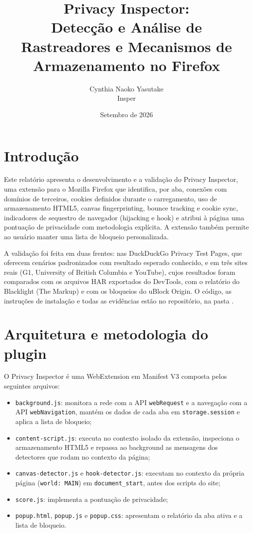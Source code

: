 \documentclass[11pt,a4paper]{article}
\title{
    Privacy Inspector:\\
    Detecção e Análise de Rastreadores e Mecanismos de Armazenamento no Firefox
}
\author{Cynthia Naoko Yasutake\\Insper}
\date{Setembro de 2026}
\begin{document}
\sloppy

\maketitle

\section{Introdução}

Este relatório apresenta o desenvolvimento e a validação do Privacy Inspector, uma extensão para o Mozilla Firefox que identifica, por aba, conexões com domínios de terceiros, cookies definidos durante o carregamento, uso de armazenamento HTML5, canvas fingerprinting, bounce tracking e cookie sync, indicadores de sequestro de navegador (hijacking e hook) e atribui à página uma pontuação de privacidade com metodologia explícita. A extensão também permite ao usuário manter uma lista de bloqueio personalizada.

A validação foi feita em duas frentes: nas DuckDuckGo Privacy Test Pages, que oferecem cenários padronizados com resultado esperado conhecido, e em três sites reais (G1, University of British Columbia e YouTube), cujos resultados foram comparados com os arquivos HAR exportados do DevTools, com o relatório do Blacklight (The Markup) e com os bloqueios do uBlock Origin. O código, as instruções de instalação e todas as evidências estão no repositório, na pasta .

\section{Arquitetura e metodologia do plugin}

O Privacy Inspector é uma WebExtension em Manifest V3 composta pelos seguintes arquivos:

\begin{itemize}
  \item \texttt{background.\allowbreak{}js}: monitora a rede com a API \texttt{webRequest} e a navegação com a API \texttt{webNavigation}, mantém os dados de cada aba em \texttt{storage.\allowbreak{}session} e aplica a lista de bloqueio;
  \item \texttt{content-script.\allowbreak{}js}: executa no contexto isolado da extensão, inspeciona o armazenamento HTML5 e repassa ao background as mensagens dos detectores que rodam no contexto da página;
  \item \texttt{canvas-detector.\allowbreak{}js} e \texttt{hook-detector.\allowbreak{}js}: executam no contexto da própria página (\texttt{world: MAIN}) em \texttt{document\_start}, antes dos scripts do site;
  \item \texttt{score.\allowbreak{}js}: implementa a pontuação de privacidade;
  \item \texttt{popup.\allowbreak{}html}, \texttt{popup.\allowbreak{}js} e \texttt{popup.\allowbreak{}css}: apresentam o relatório da aba ativa e a lista de bloqueio.
\end{itemize}
\end{document}
